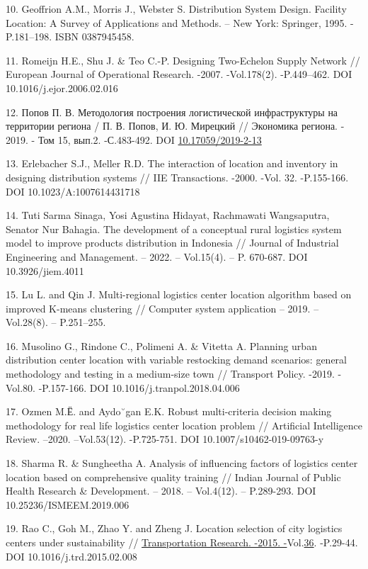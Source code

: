 \begin{references}
10. Geoffrion A.M., Morris J., Webster S. Distribution System Design.
Facility Location: A Survey of Applications and Methods. -- New York:
Springer, 1995. -P.181--198. ISBN 0387945458.

11. Romeijn H.E., Shu J. \& Teo C.-P. Designing Two-Echelon Supply Network
// European Journal of Operational Research. -2007. -Vol.178(2).
-P.449--462.
DOI 10.1016/j.ejor.2006.02.016

12. Попов П. В. Методология построения логистической инфраструктуры на
территории региона / П. В. Попов, И. Ю. Мирецкий // Экономика региона.
- 2019. - Том 15, вып.2. -С.483-492. DOI
\href{http://dx.doi.org/10.17059/2019-2-13}{10.17059/2019-2-13}

13. Erlebacher S.J., Meller R.D. The interaction of location and inventory
in designing distribution systems // IIE Transactions. -2000. -Vol.
32. -P.155-166. DOI 10.1023/A:1007614431718

14. Tuti Sarma Sinaga, Yosi Agustina Hidayat, Rachmawati Wangsaputra,
Senator Nur Bahagia. The development of a conceptual rural logistics
system model to improve products distribution in Indonesia // Journal
of Industrial Engineering and Management. -- 2022. -- Vol.15(4). -- P.
670-687. DOI \\10.3926/jiem.4011

15. Lu L. and Qin J. Multi-regional logistics center location algorithm
based on improved K-means clustering // Computer system application --
2019. -- Vol.28(8). -- P.251--255.

16. Musolino G., Rindone C., Polimeni A. \& Vitetta A. Planning urban
distribution center location with variable restocking demand
scenarios: general methodology and testing in a medium-size town //
Transport Policy. -2019. -Vol.80. -P.157-166. DOI
10.1016/j.tranpol.2018.04.006

17. Ozmen M.Ё. and Aydo˘gan E.K. Robust multi-criteria decision making
methodology for real life logistics center location problem //
Artificial Intelligence Review. --2020. --Vol.53(12). -P.725-751.
DOI 10.1007/s10462-019-09763-y

18. Sharma R. \& Sungheetha A. Analysis of influencing factors of
logistics center location based on comprehensive quality training //
Indian Journal of Public Health Research \& Development. -- 2018. --
Vol.4(12). -- P.289-293. DOI 10.25236/ISMEEM.2019.006

19. Rao C., Goh M., Zhao Y. and Zheng J. Location selection of city
logistics centers under sustainability //
\href{https://www.sciencedirect.com/journal/transportation-research-part-d-transport-and-environment}{Transportation
Research. -2015.
-}Vol.\href{file:///C:/Users/admin/Desktop/загрузки/36}{36}. -P.29-44.
DOI 10.1016/j.trd.2015.02.008


\end{references}
